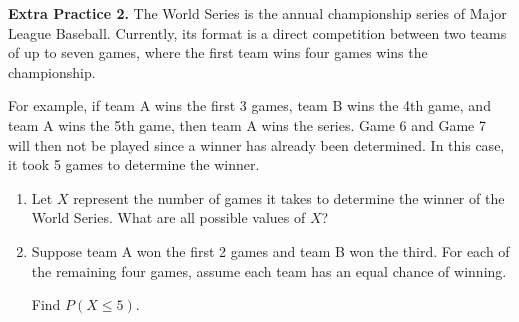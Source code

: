 \documentclass[10pt]{article}
\begin{document}
{\bf\color{blue}Extra Practice 2.}\reversemarginpar{} 
The World Series is the annual championship series of Major League Baseball. Currently, its format is a direct competition between two teams of up to seven games, where the first team wins four games wins the championship.

For example, if team A wins the first 3 games, team B wins the 4th game, and team A wins the 5th game, then team A wins the series. Game 6 and Game 7 will then not be played since a winner has already been determined. In this case, it took 5 games to determine the winner.

    \begin{enumerate}
    \item[(a)] Let $X$ represent the number of games it takes to determine the winner of the World Series. What are all possible values of $X$?
    \vfill

    \item[(b)] Suppose team A won the first 2 games and team B won the third. For each of the remaining four games, assume each team has an equal chance of winning. 

    Find $P(X\le 5)$.

    \vfill

    \end{enumerate}
\end{document}
